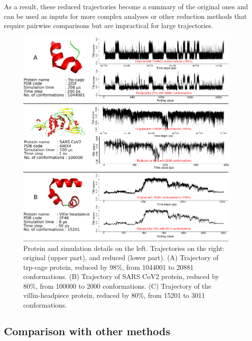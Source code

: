 \documentclass[twocolumn]{bmcart}%
\begin{document}
As a result, these reduced trajectories become a summary of the original ones and can be used as inputs for more complex analyses or other reduction methods that require pairwise comparisons but are impractical for large trajectories.

\begin{figure}[!t]
\begin{centering}
\includegraphics{images/05-path-comparisons}
\par\end{centering}
\caption{ Protein and simulation details on the left. Trajectories on the right: original (upper part), and reduced (lower part). (A) Trajectory of trp-cage protein, reduced by 98\%, from 1044001 to 20881 conformations. (B) Trajectory of SARS CoV2 protein, reduced by 80\%, from 100000 to 2000 conformations. (C) Trajectory of the villin-headpiece protein, reduced by 80\%, from 15201 to 3011 conformations. \label{fig:Trajectory-Results}}
\end{figure}


\subsection*{Comparison with other methods \label{sec:Comparing-other-methods}}
\end{document}

